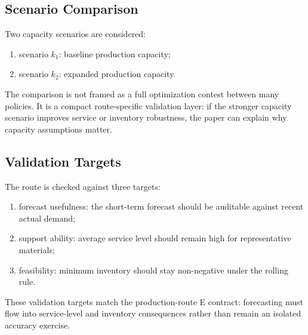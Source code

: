 \subsection{Scenario Comparison}

Two capacity scenarios are considered:

\begin{enumerate}
\item scenario $k_1$: baseline production capacity;
\item scenario $k_2$: expanded production capacity.
\end{enumerate}

The comparison is not framed as a full optimization contest between many policies. It is a compact route-specific validation layer: if the stronger capacity scenario improves service or inventory robustness, the paper can explain why capacity assumptions matter.

\subsection{Validation Targets}

The route is checked against three targets:

\begin{enumerate}
\item forecast usefulness: the short-term forecast should be auditable against recent actual demand;
\item support ability: average service level should remain high for representative materials;
\item feasibility: minimum inventory should stay non-negative under the rolling rule.
\end{enumerate}

These validation targets match the production-route E contract: forecasting must flow into service-level and inventory consequences rather than remain an isolated accuracy exercise.
